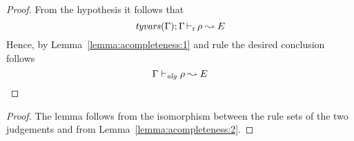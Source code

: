 \begin{proof}
  From the hypothesis it follows that 
\begin{equation*}
  \mathit{tyvars}(\Gamma);\Gamma \mathop{\vdash_{\mathrm{r}}} \rho \leadsto E
\end{equation*}
  Hence, by Lemma~\ref{lemma:acompleteness:1} and rule  the desired conclusion follows
\begin{equation*}
  \Gamma \vdash_{\mathit{alg}} \rho \leadsto E
\end{equation*}
\end{proof}

{\centering
{}}

\begin{proof}
The lemma follows from the isomorphism between the 
rule sets of the two judgements and from Lemma~\ref{lemma:acompleteness:2}.
\end{proof}

{\centering
{}}

